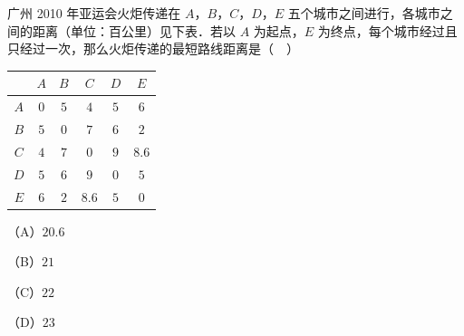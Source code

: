 \begin{question}
广州 2010 年亚运会火炬传递在 $A$，$B$，$C$，$D$，$E$ 五个城市之间进行，各城市之间的距离（单位：百公里）见下表．若以 $A$ 为起点，$E$ 为终点，每个城市经过且只经过一次，那么火炬传递的最短路线距离是（　）

\begin{center}
\begin{tabular}{cccccc}
\toprule
 & $A$ & $B$ & $C$ & $D$ & $E$ \\
\midrule
$A$ & $0$ & $5$ & $4$ & $5$ & $6$ \\
$B$ & $5$ & $0$ & $7$ & $6$ & $2$ \\
$C$ & $4$ & $7$ & $0$ & $9$ & $8.6$ \\
$D$ & $5$ & $6$ & $9$ & $0$ & $5$ \\
$E$ & $6$ & $2$ & $8.6$ & $5$ & $0$ \\
\bottomrule
\end{tabular}
\end{center}

（A）$20.6$

（B）$21$

（C）$22$

（D）$23$

\end{question}

